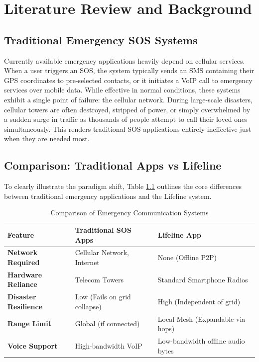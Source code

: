 
\chapter{Literature Review and Background} 

\label{Chapter2}

\section{Traditional Emergency SOS Systems}
Currently available emergency applications heavily depend on cellular services. When a user triggers an SOS, the system typically sends an SMS containing their GPS coordinates to pre-selected contacts, or it initiates a VoIP call to emergency services over mobile data. While effective in normal conditions, these systems exhibit a single point of failure: the cellular network. During large-scale disasters, cellular towers are often destroyed, stripped of power, or simply overwhelmed by a sudden surge in traffic as thousands of people attempt to call their loved ones simultaneously. This renders traditional SOS applications entirely ineffective just when they are needed most.

\section{Comparison: Traditional Apps vs Lifeline}
To clearly illustrate the paradigm shift, Table \ref{table:comparison} outlines the core differences between traditional emergency applications and the Lifeline system.

\begin{table}[h]
\centering
\begin{tabular}{|p{4cm}|p{5cm}|p{5cm}|}
\hline
\textbf{Feature} & \textbf{Traditional SOS Apps} & \textbf{Lifeline App} \\ \hline
\textbf{Network Required} & Cellular Network, Internet & None (Offline P2P) \\ \hline
\textbf{Hardware Reliance} & Telecom Towers & Standard Smartphone Radios \\ \hline
\textbf{Disaster Resilience} & Low (Fails on grid collapse) & High (Independent of grid) \\ \hline
\textbf{Range Limit} & Global (if connected) & Local Mesh (Expandable via hops) \\ \hline
\textbf{Voice Support} & High-bandwidth VoIP & Low-bandwidth offline audio bytes \\ \hline
\end{tabular}
\caption{Comparison of Emergency Communication Systems}
\label{table:comparison}
\end{table}

